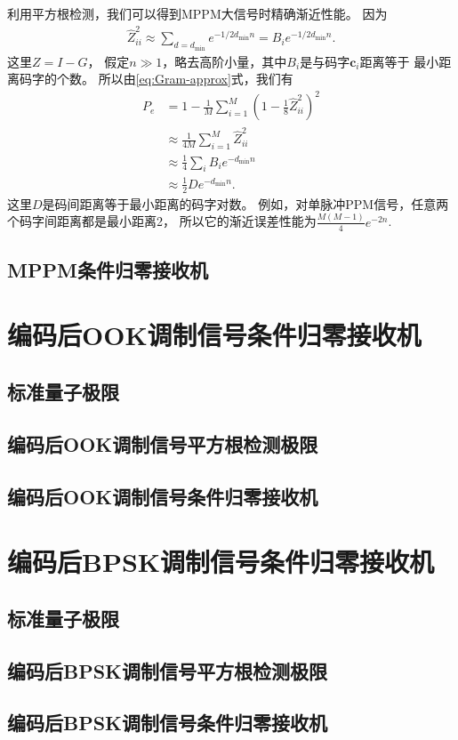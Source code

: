 利用平方根检测，我们可以得到MPPM大信号时精确渐近性能。
因为
\begin{equation}
\begin{split}
\hat{Z}^2_{ii} \approx \sum_{d=d_{\min}} e^{-1/2 d_{\min} n} = B_i e^{-1/2 d_{\min} n}.
\end{split}
\end{equation}
这里$Z = I -G$，
假定$n \gg 1$，略去高阶小量，其中$B_i$是与码字$\bm{c}_i$距离等于
最小距离码字的个数。
所以由\ref{eq:Gram-approx}式，我们有
\begin{equation}
\begin{split}
P_e &= 1 - \frac{1}{M} \sum_{i=1}^M (1 - \frac{1}{8} \hat{Z}^2_{ii})^2 \\
    &\approx \frac{1}{4M} \sum_{i=1}^M \hat{Z}^2_{ii} \\
    &\approx \frac{1}{4} \sum_i B_i e^{-d_{\min} n} \\
    &\approx \frac{1}{2} D e^{-d_{\min} n}.
\end{split}
\end{equation}
这里$D$是码间距离等于最小距离的码字对数。
例如，对单脉冲PPM信号，任意两个码字间距离都是最小距离2，
所以它的渐近误差性能为$\frac{M(M-1)}{4} e^{-2 n}$.



\subsection{MPPM条件归零接收机}




\section{编码后OOK调制信号条件归零接收机}
\subsection{标准量子极限}

\subsection{编码后OOK调制信号平方根检测极限}

\subsection{编码后OOK调制信号条件归零接收机}



\section{编码后BPSK调制信号条件归零接收机}
\subsection{标准量子极限}

\subsection{编码后BPSK调制信号平方根检测极限}

\subsection{编码后BPSK调制信号条件归零接收机}


